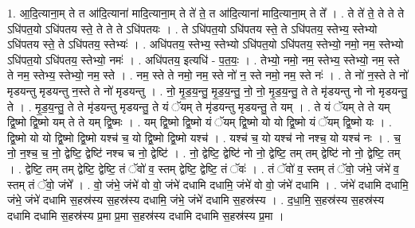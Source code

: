 \documentclass[17pt]{extarticle}
\begin{document}
1. आ॒दि॒त्याना॒म् ते त आ॑दि॒त्याना॑ मादि॒त्याना॒म् ते ते॑ ते॒ त आ॑दि॒त्याना॑ मादि॒त्याना॒म् ते ते᳚ । . ते ते॑ ते॒ ते ते ते ऽधि॑पत॒यो ऽधि॑पतय स्ते॒ ते ते ते ऽधि॑पतयः । . ते ऽधि॑पत॒यो ऽधि॑पतय स्ते॒ ते ऽधि॑पतय॒ स्तेभ्य॒ स्तेभ्यो ऽधि॑पतय स्ते॒ ते ऽधि॑पतय॒ स्तेभ्यः॑ । . अधि॑पतय॒ स्तेभ्य॒ स्तेभ्यो ऽधि॑पत॒यो ऽधि॑पतय॒ स्तेभ्यो॒ नमो॒ नम॒ स्तेभ्यो ऽधि॑पत॒यो ऽधि॑पतय॒ स्तेभ्यो॒ नमः॑ । . अधि॑पतय॒ इत्यधि॑ - प॒त॒यः॒ । . तेभ्यो॒ नमो॒ नम॒ स्तेभ्य॒ स्तेभ्यो॒ नम॒ स्ते ते नम॒ स्तेभ्य॒ स्तेभ्यो॒ नम॒ स्ते । . नम॒ स्ते ते नमो॒ नम॒ स्ते नो॑ न॒ स्ते नमो॒ नम॒ स्ते नः॑ । . ते नो॑ न॒स्ते ते नो॑ मृडयन्तु मृडयन्तु न॒स्ते ते नो॑ मृडयन्तु । . नो॒ मृ॒ड॒य॒न्तु॒ मृ॒ड॒य॒न्तु॒ नो॒ नो॒ मृ॒ड॒य॒न्तु॒ ते ते मृ॑डयन्तु नो नो मृडयन्तु॒ ते । . मृ॒ड॒य॒न्तु॒ ते ते मृ॑डयन्तु मृडयन्तु॒ ते यं ॅयम् ते मृ॑डयन्तु मृडयन्तु॒ ते यम् । . ते यं ॅयम् ते ते यम् द्वि॒ष्मो द्वि॒ष्मो यम् ते ते यम् द्वि॒ष्मः । . यम् द्वि॒ष्मो द्वि॒ष्मो यं ॅयम् द्वि॒ष्मो यो यो द्वि॒ष्मो यं ॅयम् द्वि॒ष्मो यः । . द्वि॒ष्मो यो यो द्वि॒ष्मो द्वि॒ष्मो यश्च॑ च॒ यो द्वि॒ष्मो द्वि॒ष्मो यश्च॑ । . यश्च॑ च॒ यो यश्च॑ नो नश्च॒ यो यश्च॑ नः । . च॒ नो॒ न॒श्च॒ च॒ नो॒ द्वेष्टि॒ द्वेष्टि॑ नश्च च नो॒ द्वेष्टि॑ । . नो॒ द्वेष्टि॒ द्वेष्टि॑ नो नो॒ द्वेष्टि॒ तम् तम् द्वेष्टि॑ नो नो॒ द्वेष्टि॒ तम् । . द्वेष्टि॒ तम् तम् द्वेष्टि॒ द्वेष्टि॒ तं ॅवो॑ व॒ स्तम् द्वेष्टि॒ द्वेष्टि॒ तं ॅवः॑ । . तं ॅवो॑ व॒ स्तम् तं ॅवो॒ जंभे॒ जंभे॑ व॒ स्तम् तं ॅवो॒ जंभे᳚ । . वो॒ जंभे॒ जंभे॑ वो वो॒ जंभे॑ दधामि दधामि॒ जंभे॑ वो वो॒ जंभे॑ दधामि । . जंभे॑ दधामि दधामि॒ जंभे॒ जंभे॑ दधामि स॒हस्र॑स्य स॒हस्र॑स्य दधामि॒ जंभे॒ जंभे॑ दधामि स॒हस्र॑स्य । . द॒धा॒मि॒ स॒हस्र॑स्य स॒हस्र॑स्य दधामि दधामि स॒हस्र॑स्य प्र॒मा प्र॒मा स॒हस्र॑स्य दधामि दधामि स॒हस्र॑स्य प्र॒मा । \newline
\end{document}
